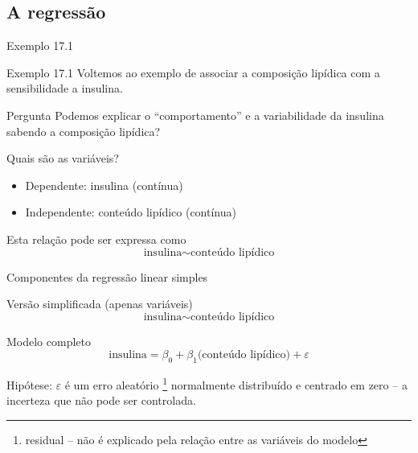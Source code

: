 \documentclass{beamer}
\begin{document}
\subsection{A regressão}

\begin{frame}{\scriptsize Exemplo 17.1}
  \begin{exampleblock}{Exemplo 17.1}
    Voltemos ao exemplo de associar a composição lipídica com a sensibilidade a insulina.    
  \end{exampleblock}
  \begin{block}{Pergunta}
    \footnotesize
    Podemos explicar o ``comportamento'' e a variabilidade da insulina sabendo a composição lipídica?
  \end{block}
\end{frame}

\begin{frame}{\scriptsize Quais são as variáveis?}
  \begin{itemize}
  \item Dependente: insulina (contínua)
  \item Independente: conteúdo lipídico (contínua)
  \end{itemize}
  \vfill
  \begin{block}{Esta relação pode ser expressa como}
    \footnotesize
    \begin{displaymath}
      \text{insulina} \sim \text{conteúdo lipídico}
    \end{displaymath}
  \end{block}
\end{frame}

\begin{frame}{\scriptsize Componentes da regressão linear simples}
  \begin{block}{\footnotesize Versão simplificada (apenas variáveis)}
    \footnotesize
    \begin{displaymath}
      \text{insulina} \sim \text{conteúdo lipídico}
    \end{displaymath}
  \end{block}
  \bigskip
  \bigskip
  \begin{block}{Modelo completo}
    \footnotesize
    \begin{displaymath}
      \text{insulina} =\beta_0 + \beta_1 \text{(conteúdo lipídico)} + \varepsilon
    \end{displaymath}
  \end{block}
  \vfill
  \footnotesize
  Hipótese: $\varepsilon$ é um erro aleatório \footnote{\scriptsize residual -- não é explicado pela relação entre as variáveis do modelo} normalmente distribuído e centrado em zero -- a incerteza que não pode ser controlada.
\end{frame}
\end{document}
